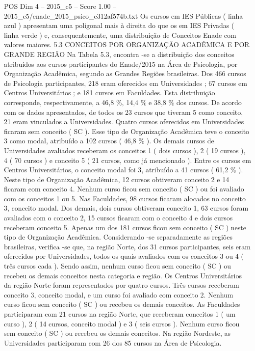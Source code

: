 \begin{textsample}{POS Dim 4 – 2015\_c5 – Score 1.00 – 2015\_c5/enade\_2015\_psico\_e312af574b.txt}
Os cursos em IES Públicas ( linha azul ) apresentam uma poligonal mais à direita do que os em IES Privadas ( linha verde ) e, consequentemente, uma distribuição de Conceitos Enade com valores maiores. 5.3 CONCEITOS POR ORGANIZAÇÃO ACADÊMICA E POR GRANDE REGIÃO Na Tabela 5.3, encontra -se a distribuição dos conceitos atribuídos aos cursos participantes do Enade/2015 na Área de Psicologia, por Organização Acadêmica, segundo as Grandes Regiões brasileiras.
Dos 466 cursos de Psicologia participantes, 218 eram oferecidos em Universidades ; 67 cursos em Centros Universitários ; e 181 cursos em Faculdades.
Esta distribuição corresponde, respectivamente, a 46,8 \%, 14,4 \% e 38,8 \% dos cursos.
De acordo com os dados apresentados, de todos os 23 cursos que tiveram 5 como conceito, 21 eram vinculados a Universidades.
Quatro cursos oferecidos em Universidades ficaram sem conceito ( SC ).
Esse tipo de Organização Acadêmica teve o conceito 3 como modal, atribuído a 102 cursos ( 46,8 \% ).
Os demais cursos de Universidades avaliados receberam os conceitos 1 ( dois cursos ), 2 ( 19 cursos ), 4 ( 70 cursos ) e conceito 5 ( 21 cursos, como já mencionado ).
Entre os cursos em Centros Universitários, o conceito modal foi 3, atribuído a 41 cursos ( 61,2 \% ).
Neste tipo de Organização Acadêmica, 12 cursos obtiveram conceito 2 e 14 ficaram com conceito 4.
Nenhum curso ficou sem conceito ( SC ) ou foi avaliado com os conceitos 1 ou 5.
Nas Faculdades, 98 cursos ficaram alocados no conceito 3, conceito modal.
Dos demais, dois cursos obtiveram conceito 1, 63 cursos foram avaliados com o conceito 2, 15 cursos ficaram com o conceito 4 e dois cursos receberam conceito 5.
Apenas um dos 181 cursos ficou sem conceito ( SC ) neste tipo de Organização Acadêmica.
Considerando -se separadamente as regiões brasileiras, verifica -se que, na região Norte, dos 31 cursos participantes, seis eram oferecidos por Universidades, todos os quais avaliados com os conceitos 3 ou 4 ( três cursos cada ).
Sendo assim, nenhum curso ficou sem conceito ( SC ) ou recebeu os demais conceitos nesta categoria e região.
Os Centros Universitários da região Norte foram representados por quatro cursos.
Três cursos receberam conceito 3, conceito modal, e um curso foi avaliado com conceito 2.
Nenhum curso ficou sem conceito ( SC ) ou recebeu os demais conceitos.
As Faculdades participaram com 21 cursos na região Norte, que receberam conceitos 1 ( um curso ), 2 ( 14 cursos, conceito modal ) e 3 ( seis cursos ).
Nenhum curso ficou sem conceito ( SC ) ou recebeu os demais conceitos.
Na região Nordeste, as Universidades participaram com 26 dos 85 cursos na Área de Psicologia.

\end{textsample}
